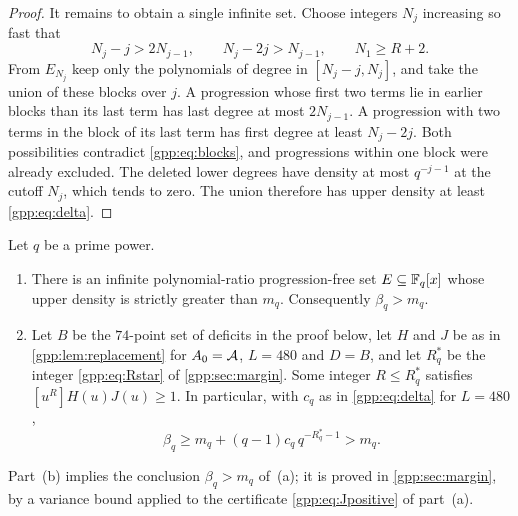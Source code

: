 \begin{proof}
It remains to obtain a single infinite set. Choose integers $N_j$ increasing so fast that
\begin{equation}\label{gpp:eq:blocks}
 N_j-j>2N_{j-1},\qquad N_j-2j>N_{j-1},\qquad N_1\ge R+2 .
\end{equation}
From $E_{N_j}$ keep only the polynomials of degree in $[N_j-j,N_j]$, and take the union of
these blocks over $j$. A progression whose first two terms lie in earlier blocks than its
last term has last degree at most $2N_{j-1}$. A progression with two terms in the block
of its last term has first degree at least $N_j-2j$. Both possibilities contradict
\eqref{gpp:eq:blocks}, and progressions within one block were already excluded. The
deleted lower degrees have density at most $q^{-j-1}$ at the cutoff $N_j$, which tends to
zero. The union therefore has upper density at least \eqref{gpp:eq:delta}.
\end{proof}

\begin{theorem}\label{gpp:thm:counterexample}
Let $q$ be a prime power.
\begin{enumerate}[label=\textup{(\alph*)}]
\item There is an infinite polynomial-ratio progression-free set $E\subseteq\mathbb{F}_q[x]$ whose
 upper density is strictly greater than $m_q$. Consequently $\beta_q>m_q$.
\item\label{gpp:thm:cutoff} Let $B$ be the $74$-point set of deficits in the proof below, let
 $H$ and $J$ be as in \cref{gpp:lem:replacement} for $A_0=\mathcal{A}$, $L=480$ and $D=B$, and let
 $R_q^*$ be the integer \eqref{gpp:eq:Rstar} of \cref{gpp:sec:margin}. Some integer
 $R\le R_q^*$ satisfies $[u^R]H(u)J(u)\ge1$. In particular, with $c_q$ as in
 \eqref{gpp:eq:delta} for $L=480$,
 \begin{equation}\label{gpp:eq:explicitgap}
 \beta_q\ge m_q+(q-1)c_q\,q^{-R_q^*-1}>m_q .
 \end{equation}
\end{enumerate}
\end{theorem}

Part~(b) implies the conclusion $\beta_q>m_q$ of~(a); it is proved in \cref{gpp:sec:margin},
by a variance bound applied to the certificate \eqref{gpp:eq:Jpositive} of part~(a).

